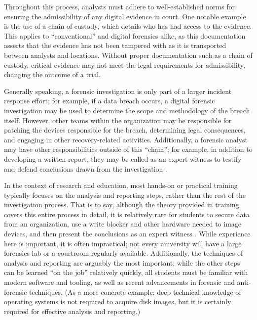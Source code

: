 \documentclass[letterpaper,12pt]{report}
\begin{document}
Throughout this process, analysts must adhere to well-established norms
for ensuring the admissibility of any digital evidence in court. One
notable example is the use of a chain of custody, which details who has
had access to the evidence. This applies to ``conventional'' and digital
forensics alike, as this documentation asserts that the evidence has not
been tampered with as it is transported between analysts and locations.
Without proper documentation such as a chain of custody, critical
evidence may not meet the legal requirements for admissibility, changing
the outcome of a trial.

Generally speaking, a forensic investigation is only part of a larger
incident response effort; for example, if a data breach occurs, a
digital forensic investigation may be used to determine the scope and
methodology of the breach itself. However, other teams within the
organization may be responsible for patching the devices responsible for
the breach, determining legal consequences, and engaging in other
recovery-related activities. Additionally, a forensic analyst may have
other responsibilities outside of this ``chain''; for example, in
addition to developing a written report, they may be called as an expert
witness to testify and defend conclusions drawn from the investigation
\cite{andersonComparativeStudyTeaching2006,conklinComputerForensics2022,cooperStandardsDigitalForensics2010}.

In the context of research and education, most hands-on or practical
training typically focuses on the analysis and reporting steps, rather
than the rest of the investigation process. That is to say, although the
theory provided in training covers this entire process in detail, it is
relatively rare for students to secure data from an organization, use a
write blocker and other hardware needed to image devices, and then
present the conclusions as an expert witness
\cite{cooperStandardsDigitalForensics2010}. While experience here is
important, it is often impractical; not every university will have a
large forensics lab or a courtroom regularly available. Additionally,
the techniques of analysis and reporting are arguably the most
important; while the other steps can be learned ``on the job''
relatively quickly, all students must be familiar with modern software
and tooling, as well as recent advancements in forensic and
anti-forensic techniques. (As a more concrete example: deep technical
knowledge of operating systems is not required to acquire disk images,
but it is certainly required for effective analysis and reporting.)
\end{document}
